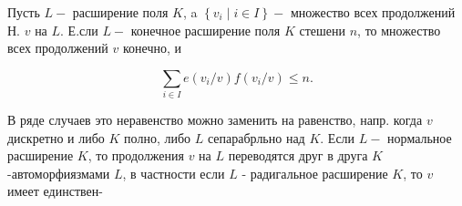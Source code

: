 \documentclass[10pt]{article}
\begin{document}
Пусть $L-$ расширение поля $K$, a $\left\{v_{i} \mid i \in I\right\}-$ множество всех продолжений Н. $v$ на $L$. Е.сли $L-$ конечное расширение поля $K$ стешени $n$, то множество всех продолжений $v$ конечно, и



\[

\sum_{i \in I} e\left(v_{i} / v\right) f\left(v_{i} / v\right) \leqslant n .

\]



В ряде случаев это неравенство можно заменить на равенство, напр. когда $v$ дискретно и либо $K$ полно, либо $L$ сепарабрльно над $K$. Если $L-$ нормальное расширение $K$, то продолжения $v$ на $L$ переводятся друг в друга $K$-автоморфиязмами $L$, в частности если $L$ - радигальное расширение $K$, то $v$ имеет единствен-
\end{document}
